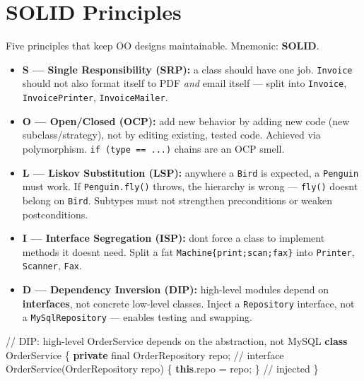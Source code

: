 \documentclass[11pt]{article}
\providecommand{\tightlist}{\setlength{\itemsep}{1pt}\setlength{\parskip}{0pt}}
\newenvironment{Shaded}{\begin{snugshade}}{\end{snugshade}}
\newcommand{\CommentTok}[1]{\textcolor[rgb]{0.48,0.49,0.49}{#1}}
\newcommand{\DataTypeTok}[1]{\textcolor[rgb]{0.16,0.50,0.73}{#1}}
\newcommand{\FunctionTok}[1]{\textcolor[rgb]{0.56,0.27,0.68}{#1}}
\newcommand{\KeywordTok}[1]{\textcolor[rgb]{0.81,0.81,0.76}{\textbf{#1}}}
\newcommand{\NormalTok}[1]{\textcolor[rgb]{0.81,0.81,0.76}{#1}}
\newcommand{\OperatorTok}[1]{\textcolor[rgb]{0.81,0.81,0.76}{#1}}
\begin{document}
\section{SOLID Principles}\label{solid-principles}

Five principles that keep OO designs maintainable. Mnemonic: \textbf{SOLID}.


\begin{itemize}
\tightlist
\item
  \textbf{S --- Single Responsibility (SRP):} a class should have one job. \texttt{Invoice} should not also format itself to PDF \emph{and} email itself --- split into \texttt{Invoice}, \texttt{InvoicePrinter}, \texttt{InvoiceMailer}.
\item
  \textbf{O --- Open/Closed (OCP):} add new behavior by adding new code (new subclass/strategy), not by editing existing, tested code. Achieved via polymorphism. \texttt{if\ (type\ ==\ ...)} chains are an OCP smell.
\item
  \textbf{L --- Liskov Substitution (LSP):} anywhere a \texttt{Bird} is expected, a \texttt{Penguin} must work. If \texttt{Penguin.fly()} throws, the hierarchy is wrong --- \texttt{fly()} doesn\textquotesingle t belong on \texttt{Bird}. Subtypes must not strengthen preconditions or weaken postconditions.
\item
  \textbf{I --- Interface Segregation (ISP):} don\textquotesingle t force a class to implement methods it doesn\textquotesingle t need. Split a fat \texttt{Machine\{print;scan;fax\}} into \texttt{Printer}, \texttt{Scanner}, \texttt{Fax}.
\item
  \textbf{D --- Dependency Inversion (DIP):} high-level modules depend on \textbf{interfaces}, not concrete low-level classes. Inject a \texttt{Repository} interface, not a \texttt{MySqlRepository} --- enables testing and swapping.
\end{itemize}


\begin{Shaded}
\begin{Highlighting}[]
\CommentTok{// DIP: high{-}level OrderService depends on the abstraction, not MySQL}
\KeywordTok{class}\NormalTok{ OrderService }\OperatorTok{\{}
    \KeywordTok{private} \DataTypeTok{final}\NormalTok{ OrderRepository repo}\OperatorTok{;}            \CommentTok{// interface}
    \FunctionTok{OrderService}\OperatorTok{(}\NormalTok{OrderRepository repo}\OperatorTok{)} \OperatorTok{\{} \KeywordTok{this}\OperatorTok{.}\FunctionTok{repo} \OperatorTok{=}\NormalTok{ repo}\OperatorTok{;} \OperatorTok{\}}   \CommentTok{// injected}
\OperatorTok{\}}
\end{Highlighting}
\end{Shaded}
\end{document}
